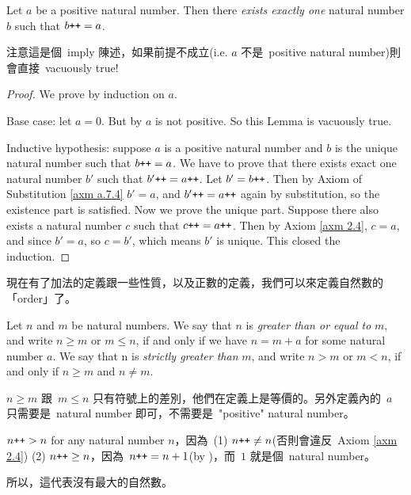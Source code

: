 \begin{lemma}\label{lem 2.2.10}
Let \(a\) be a positive natural number. Then there \emph{exists exactly one} natural number \(b\) such that \(b\texttt{++} = a\).
\end{lemma}
\begin{note}
注意這是個\ imply 陳述，如果前提不成立(i.e. \(a\) 不是\ positive natural number)則會直接\ vacuously true!
\end{note}
\begin{proof}
We prove by induction on \(a\).

Base case: let \(a = 0\). But by  \(a\) is not positive. So this Lemma is vacuously true.

Inductive hypothesis: suppose \(a\) is a positive natural number and \(b\) is the unique natural number such that \(b\texttt{++} = a\). We have to prove that there exists exact one natural number \(b'\) such that \(b'\texttt{++} = a\texttt{++}\). Let \(b' = b\texttt{++}\). Then by Axiom of Substitution \ref{axm a.7.4} \(b' = a\), and \(b'\texttt{++} = a\texttt{++}\) again by substitution, so the existence part is satisfied. Now we prove the unique part. Suppose there also exists a natural number \(c\) such that \(c\texttt{++} = a\texttt{++}\). Then by Axiom \ref{axm 2.4}, \(c = a\), and since \(b' = a\), so \(c = b'\), which means \(b'\) is unique. This closed the induction.
\end{proof}

\begin{note}
現在有了加法的定義跟一些性質，以及正數的定義，我們可以來定義自然數的「order」了。
\end{note}

\begin{definition} \label{def 2.2.11} Let \(n\) and \(m\) be natural numbers. We say that \(n\) is \emph{greater than or equal to} \(m\), and write \(n \geq m\) or \(m \leq n\), if and only if we have \(n = m + a\) for some natural number \(a\). We say that n is \emph{strictly greater than} \(m\), and write \(n > m\) or \(m < n\), if and only if \(n \geq m\) and \(n \neq m\).
\end{definition}
\begin{note}
\(n \geq m\) 跟\ \(m \leq n\) 只有符號上的差別，他們在定義上是等價的。另外定義內的\ \(a\) 只需要是\ natural number 即可，不需要是\ "positive" natural number。
\end{note}
\begin{additional corollary} \label{ac 2.2.3}
\(n\texttt{++} > n\) for any natural number \(n\)，因為\ (1) \(n\texttt{++} \neq n\)(否則會違反\ Axiom \ref{axm 2.4}) (2) \(n\texttt{++} \geq n\)，因為\ \(n\texttt{++} = n + 1\)(by )，而\ \(1\) 就是個\ natural number。

所以，這代表沒有最大的自然數。
\end{additional corollary}

